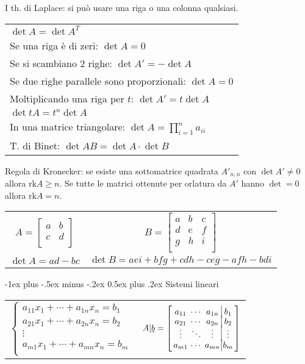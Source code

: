 \documentclass[10pt,landscape]{article}
\makeatletter
\renewcommand{\section}{\@startsection{section}{1}{0mm}%
                                {-1ex plus -.5ex minus -.2ex}%
                                {0.5ex plus .2ex}%
                                {\normalfont\large\bfseries}}
\renewcommand{\vec}[1]{\underline{#1}}
\newcommand{\rk}{\mathrm{rk}}
\makeatother
\begin{document}
\begin{multicols}{3}
I th. di Laplace: si può usare una riga o una colonna qualsiasi.

\begin{tabular}{l}
	$\det A = \det A^T$ \\
	Se una riga è di zeri: $\det A = 0$ \\
	Se si scambiano 2 righe: $\det A' = -\det A$ \\
	Se due righe parallele sono proporzionali: $\det A = 0$ \\
	Moltiplicando una riga per $t$: $\det A' = t\det A$ \\
	$\det tA = t^n\det A$ \\
	In una matrice triangolare: $\det A = \prod_{i=1}^{n} a_{ii}$ \\
	T. di Binet: $\det AB = \det A \cdot \det B$
\end{tabular}

Regola di Kronecker: se esiste una sottomatrice quadrata $A'_{n,n}$ con $\det A' \ne 0$ allora $\rk A \ge n$.
Se tutte le matrici ottenute per orlatura da $A'$ hanno $\det = 0$ allora $\rk A = n$.

\begin{tabular}{cc}
	$A = \begin{bmatrix}
	a & b \\
	c & d \\
	\end{bmatrix}$ &
	$B = \begin{bmatrix}
	a & b & c \\
	d & e & f \\
	g & h & i \\
	\end{bmatrix}$ \\
	$\det A = ad - bc$ &
	$\det B = aei + bfg + cdh - ceg - afh - bdi$ \\
\end{tabular}

\section{Sistemi lineari}
\begin{tabular}{@{}l@{}l@{}}
	$\begin{cases}
		a_{11}x_1 + \cdots + a_{1n}x_n = b_1 \\[-0.3em]
		a_{21}x_1 + \cdots + a_{2n}x_n = b_2 \\[-0.3em]
		\vdots \\[-0.3em]
		a_{m1}x_1 + \cdots + a_{mn}x_n = b_m \\
	\end{cases}$ &
	$A|\vec{b} = \left[
		\arraycolsep=1.7pt\def\arraystretch{1.2}
		\begin{array}{ccc|c}
			a_{11} & \cdots & a_{1n} & b_1 \\[-0.3em]
			a_{21} & \cdots & a_{2n} & b_2 \\[-0.3em]
			\vdots & \ddots & \vdots & \vdots \\[-0.3em]
			a_{m1} & \cdots & a_{mn} & b_m \\
		\end{array}
		\right]$
\end{tabular}


\end{multicols}
\end{document}
